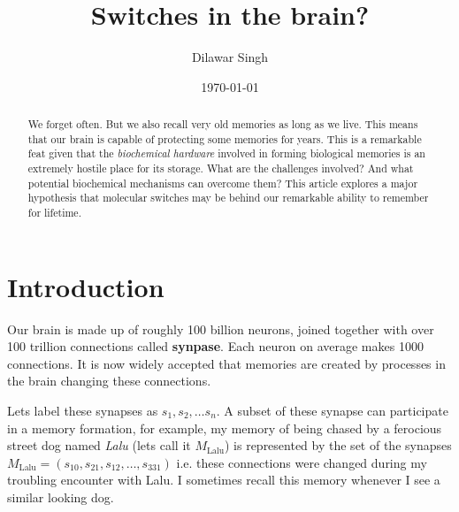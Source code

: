 \documentclass[]{resonance}
\title{Switches in the brain?}
\author{Dilawar Singh}
\date{\today}
\begin{document}
\maketitle



\begin{abstract}

    We forget often. But we also recall very old memories as long as we live.
    This means that our brain is capable of protecting some memories for years.
    This is a remarkable feat given that the \emph{biochemical hardware}
    involved in forming biological memories is an extremely hostile place for
    its storage.  What are the challenges involved? And what potential
    biochemical mechanisms can overcome them? This article explores a major
    hypothesis that molecular switches may be behind our remarkable ability to
    remember for lifetime.

\end{abstract}

\maketitle
{}

\section{Introduction}\label{sec:intro}

Our brain is made up of roughly 100 billion neurons, joined together with over
100 trillion connections called \textbf{synpase}. Each neuron on average makes
1000 connections.  It is now widely accepted that memories are
created by processes in the brain changing these connections. 

Lets label these synapses as $s_1, s_2, \ldots s_n$. A subset of these synapse
can participate in a memory formation, for example, my memory of being chased by
a ferocious street dog named \emph{Lalu} (lets call it $M_\text{Lalu}$) is
represented by the set of the synapses $M_\text{Lalu}=(s_{10}, s_{21},
s_{12},\ldots,s_{331})$ i.e. these connections were changed during my troubling
encounter with Lalu. I sometimes recall this memory whenever I see a similar
looking dog. 
\end{document}
